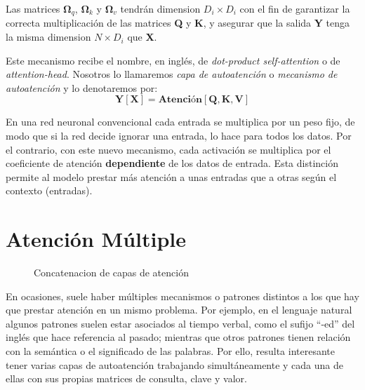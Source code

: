 Las matrices $\mathbf{\Omega}_q $, $\mathbf{\Omega}_k $ y $\mathbf{\Omega}_v$ tendrán dimension $D_i \times D_i$ con el fin de garantizar la correcta multiplicación de las matrices \textbf{Q} y \textbf{K}, y asegurar que la salida \textbf{Y} tenga la misma dimension $N \times D_i$ que \textbf{X}.

Este mecanismo  recibe el nombre, en inglés, de \textit{dot-product self-attention} o de \textit{attention-head}. Nosotros lo llamaremos \textit{capa de autoatención} o \textit{mecanismo de autoatención} y lo denotaremos por:
\begin{equation}
    \mathbf{Y}[\mathbf{X}] = \textbf{Atención}[\mathbf{Q}, \mathbf{K}, \mathbf{V}]
    \label{atencion}
\end{equation}

En una red neuronal convencional cada entrada  se multiplica por un peso fijo, de modo que si la red decide ignorar una entrada, lo hace para todos los datos. Por el contrario, con este nuevo mecanismo, cada activación se multiplica por el coeficiente de atención \textbf{dependiente} de los datos de entrada. Esta distinción permite al modelo prestar más atención a unas entradas que a otras según el contexto (entradas).



\section{Atención Múltiple}

\begin{figure}[t]
    \vspace{0.8cm}
    \centering
    \ConcatenarMatrices
    \caption{Concatenacion de capas de atención}
    \label{fig:concatenar_matrices}
    \vspace{0.8cm}
\end{figure}

En ocasiones, suele haber múltiples mecanismos o patrones distintos a los que hay que prestar atención en un mismo problema. Por ejemplo, en el lenguaje natural algunos patrones suelen estar asociados al tiempo verbal, como el sufijo ``-ed'' del inglés que hace referencia al pasado; mientras que otros patrones tienen relación con la semántica o el significado de las palabras. Por ello, resulta interesante tener varias capas de autoatención trabajando simultáneamente y cada una de ellas  con sus propias matrices de consulta, clave y valor.

